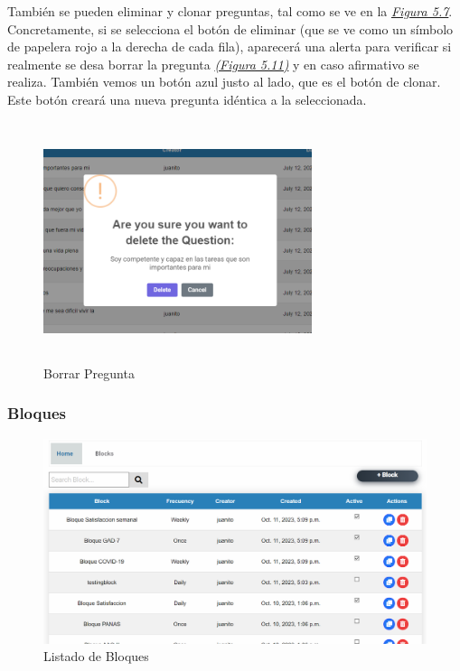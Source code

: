 También se pueden eliminar y clonar preguntas, tal como se ve en la \textit{\hyperref[fig:vista-preguntas]{Figura 5.7}}. Concretamente, si se selecciona el botón de eliminar (que se ve como un símbolo de papelera rojo a la derecha de cada fila), aparecerá una alerta para verificar si realmente se desa borrar la pregunta \textit{\hyperref[fig:delete-question]{(Figura 5.11)}} y en caso afirmativo se realiza. También vemos un botón azul justo al lado, que es el botón de clonar. Este botón creará una nueva pregunta idéntica a la seleccionada.

\begin{figure}[!ht]
    \centering
    \includegraphics[width=0.7\textwidth, height=7cm]{imagenes/delete_question.png}
    \caption{ Borrar Pregunta}
    \label{fig:delete-question}
\end{figure}


\subsubsection{Bloques}\vspace{0.5cm}

\begin{figure}[!ht]
    \centering
    \includegraphics[width=1\textwidth]{imagenes/list_bloques.png}
    \caption{Listado de Bloques}
    \label{fig:lista-bloques}
\end{figure}

